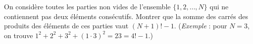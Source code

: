 On considère toutes les parties non vides de l'ensemble $\{1, 2, \ldots, N\}$ qui ne contiennent pas deux éléments consécutifs. Montrer que la somme des carrés des produits des éléments de ces parties vaut $(N + 1)! - 1$. (\emph{Exemple} : pour $N = 3$, on trouve $1^2 + 2^2 + 3^2 + (1 \cdot 3)^2 = 23 = 4! - 1$.)
